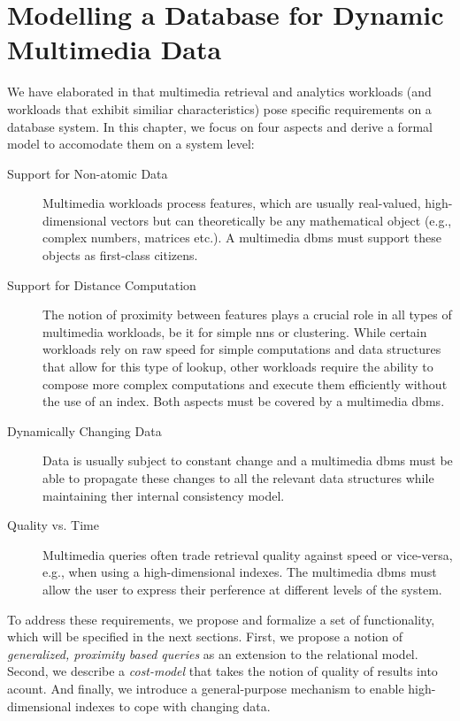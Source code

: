\chapter{Modelling a Database for Dynamic Multimedia Data}
\label{chapter:system_model}

We have elaborated in  that multimedia retrieval and analytics workloads (and workloads that exhibit similiar characteristics) pose specific requirements on a database system. In this chapter, we focus on four aspects and derive a formal model to accomodate them on a system level:

\begin{description}
    \item[Support for Non-atomic Data] Multimedia workloads process features, which are usually real-valued, high-dimensional vectors but can theoretically be any mathematical object (e.g., complex numbers, matrices etc.). A multimedia \acrshort{dbms} must support these objects as first-class citizens.
    \item[Support for Distance Computation] The notion of proximity between features plays a crucial role in all types of multimedia workloads, be it for simple \acrshort{nns} or clustering. While certain workloads rely on raw speed for simple computations and data structures that allow for this type of lookup, other workloads require the ability to compose more complex computations and execute them efficiently without the use of an index. Both aspects must be covered by a multimedia \acrshort{dbms}.
    \item[Dynamically Changing Data] Data is usually subject to constant change and a multimedia \acrshort{dbms} must be able to propagate these changes to all the relevant data structures while maintaining ther internal consistency model.
    \item[Quality vs. Time] Multimedia queries often trade retrieval quality against speed or vice-versa, e.g., when using a high-dimensional indexes. The multimedia \acrshort{dbms} must allow the user to express their perference at different levels of the system.
\end{description}

To address these requirements, we propose and formalize a set of functionality, which will be specified in the next sections. First, we propose a notion of \emph{generalized, proximity based queries} as an extension to the relational model. Second, we describe a \emph{cost-model} that takes the notion of quality of results into acount. And finally, we introduce a general-purpose mechanism to enable high-dimensional indexes to cope with changing data.


